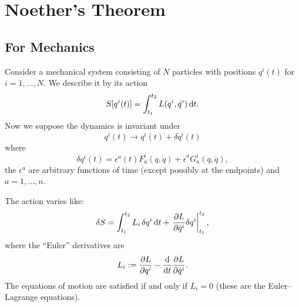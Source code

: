 \section{Noether's Theorem}

\subsection{For Mechanics}

\M
Consider a mechanical system consisting of $N$ particles with positions
$q^{i}(t)$ for $i=1,\dots,N$. We describe it by its action
\begin{equation}
S[q^{i}(t)] = \int^{t_{2}}_{t_{1}}L(q^{i},\dot{q}^{i})\,\mathrm{d} t.
\end{equation}
Now we suppose the dynamics is invariant under
\begin{equation}
q^{i}(t)\to q^{i}(t)+\delta q^{i}(t)
\end{equation}
where
\begin{equation}\label{eq:classical-field-theory:noether:epsilon-variation}
\delta q^{i}(t) = \epsilon^{a}(t)F^{i}_{a}(q,\dot{q}) + \dot{\epsilon}^{a}
G^{i}_{a}(q,\dot{q}),
\end{equation}
the $\epsilon^{a}$ are arbitrary functions of time (except possibly at
the endpoints) and $a=1,\dots,n$.

\M The action varies like:
\begin{equation}
\delta S = \int^{t_{2}}_{t_{1}}L_{i}\,\delta q^{i}\,\mathrm{d} t
  + \left.\frac{\partial L}{\partial\dot{q}^{i}}\delta q^{i}\right|^{t_{2}}_{t_{1}},
\end{equation}
where the ``Euler'' derivatives are
\begin{equation}
L_{i} := \frac{\partial L}{\partial q^{i}}
- \frac{\mathrm{d}}{\mathrm{d} t}\frac{\partial L}{\partial\dot{q}^{i}}.
\end{equation}
The equations of motion are satisfied if and only if $L_{i}=0$ (these
are the Euler--Lagrange equations).

